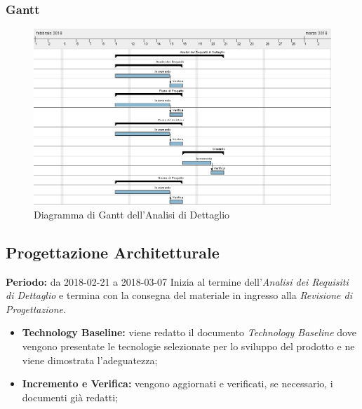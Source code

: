 \subsubsection{Gantt}
\begin{figure}[H]
	\centering 
	\includegraphics[width=1\textwidth]{images/Analisi-Dettaglio.png}
	\caption{Diagramma di Gantt dell'Analisi di Dettaglio}
	\label{graficobello2} 
\end{figure}
\subsection{Progettazione Architetturale}
    \textbf{Periodo:} da 2018-02-21 a 2018-03-07 \Spazio
    Inizia al termine dell'\emph{Analisi dei Requisiti di Dettaglio} e termina con la consegna del materiale in ingresso alla \emph{Revisione di Progettazione}.
    \begin{itemize}
    	\item \textbf{Technology Baseline:} viene redatto il documento \emph{Technology Baseline } dove vengono presentate le tecnologie selezionate per lo sviluppo del prodotto e ne viene dimostrata l'adeguatezza;
    	\item \textbf{Incremento e Verifica:} vengono aggiornati e verificati, se necessario, i documenti già redatti;
    \end{itemize}

